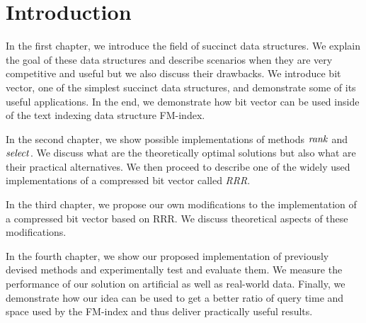 \chapter*{Introduction} %

In the first chapter, we introduce the field of succinct data structures.
We explain the goal of these data structures and describe scenarios when
they are very competitive and useful but we also discuss their drawbacks.
We introduce bit vector, one of the simplest succinct data structures, and
demonstrate some of its useful applications. In the end, we demonstrate how
bit vector can be used inside of the text indexing data structure FM-index.

In the second chapter, we show possible implementations of methods $\mathit{rank}$ and
$\mathit{select}$. We discuss what are the theoretically optimal solutions but also
what are their practical alternatives. We then proceed to describe one of the
widely used implementations of a compressed bit vector called \textit{RRR}.

In the third chapter, we propose our own modifications to the implementation of
a compressed bit vector based on RRR. We discuss theoretical aspects of these
modifications.

In the fourth chapter, we show our proposed implementation of previously devised
methods and experimentally test and evaluate them. We measure the performance
of our solution on artificial as well as real-world data. Finally, we demonstrate
how our idea can be used to get a better ratio of query time and space used by the
FM-index and thus deliver practically useful results.